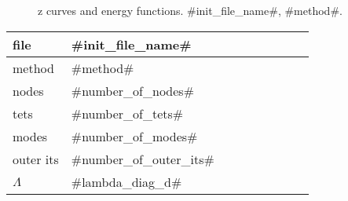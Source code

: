 

\begin{figure}
  \centering
  \caption{z curves and energy functions. #init_file_name#, #method#.}
  \label{en_f}
\end{figure}

\begin{center}
  \begin{tabular}{|l*{8}{|l}}
    \hline
	file & #init_file_name# \\ \hline
	method & #method# \\ \hline
	nodes & #number_of_nodes# \\ \hline
	tets & #number_of_tets# \\ \hline
	modes & #number_of_modes# \\ \hline
    outer its & #number_of_outer_its# \\ \hline
	$\Lambda$ &  #lambda_diag_d# 
  \end{tabular}
\end{center}